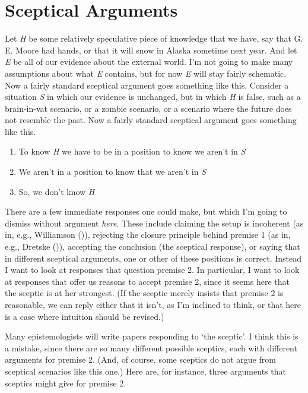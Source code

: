 \documentclass[
  10pt,
  letterpaper,
  DIV=11,
  numbers=noendperiod,
  twoside]{scrartcl}
\providecommand{\tightlist}{%
  \setlength{\itemsep}{0pt}\setlength{\parskip}{0pt}}\usepackage{longtable,booktabs,array}
\begin{document}
\section{Sceptical Arguments}\label{sceptical-arguments}

Let \emph{H} be some relatively speculative piece of knowledge that we
have, say that G. E. Moore had hands, or that it will snow in Alaska
sometime next year. And let \emph{E} be all of our evidence about the
external world. I'm not going to make many assumptions about what
\emph{E} contains, but for now \emph{E} will stay fairly schematic. Now
a fairly standard sceptical argument goes something like this. Consider
a situation \emph{S} in which our evidence is unchanged, but in which
\emph{H} is false, such as a brain-in-vat scenario, or a zombie
scenario, or a scenario where the future does not resemble the past. Now
a fairly standard sceptical argument goes something like this.

\begin{enumerate}
\def\labelenumi{\arabic{enumi}.}
\tightlist
\item
  To know \emph{H} we have to be in a position to know we aren't in
  \emph{S}
\item
  We aren't in a position to know that we aren't in \emph{S}
\item
  So, we don't know \emph{H}
\end{enumerate}

There are a few immediate responses one could make, but which I'm going
to dismiss without argument \emph{here}. These include claiming the
setup is incoherent (as in, e.g., Williamson
()), rejecting the closure
principle behind premise 1 (as in, e.g., Dretske
()), accepting the conclusion (the
sceptical response), or saying that in different sceptical arguments,
one or other of these positions is correct. Instead I want to look at
responses that question premise 2. In particular, I want to look at
responses that offer us reasons to accept premise 2, since it seems here
that the sceptic is at her strongest. (If the sceptic merely insists
that premise 2 is reasonable, we can reply either that it isn't, as I'm
inclined to think, or that here is a case where intuition should be
revised.)

Many epistemologists will write papers responding to `the sceptic'. I
think this is a mistake, since there are so many different possible
sceptics, each with different arguments for premise 2. (And, of course,
some sceptics do not argue from sceptical scenarios like this one.) Here
are, for instance, three arguments that sceptics might give for premise
2.
\end{document}
